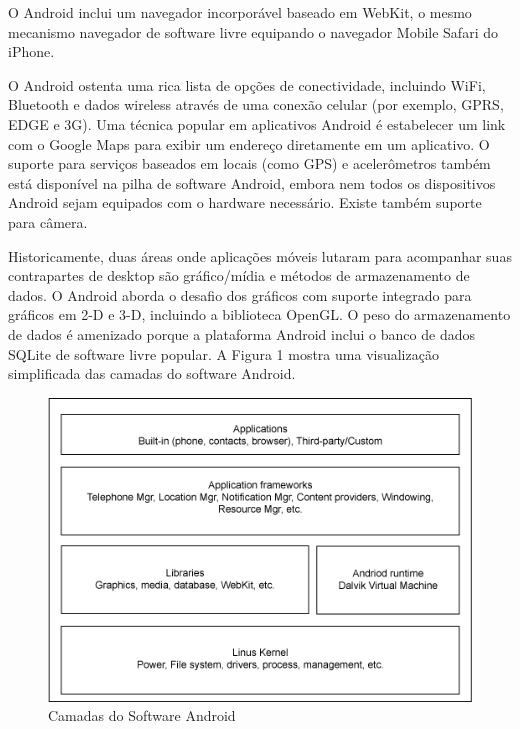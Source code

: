 \documentclass[12pt, %
openright, 
oneside, %
a4paper,    %
brazil]{facom-ufu-abntex2}
\begin{document}
O Android inclui um navegador incorporável baseado em WebKit, o mesmo mecanismo navegador de software livre equipando o navegador Mobile Safari do iPhone.

O Android ostenta uma rica lista de opções de conectividade, incluindo WiFi, Bluetooth e dados wireless através de uma conexão celular (por exemplo, GPRS, EDGE e 3G). Uma técnica popular em aplicativos Android é estabelecer um link com o Google Maps para exibir um endereço diretamente em um aplicativo. O suporte para serviços baseados em locais (como GPS) e acelerômetros também está disponível na pilha de software Android, embora nem todos os dispositivos Android sejam equipados com o hardware necessário. Existe também suporte para câmera.

Historicamente, duas áreas onde aplicações móveis lutaram para acompanhar suas contrapartes de desktop são gráfico/mídia e métodos de armazenamento de dados. O Android aborda o desafio dos gráficos com suporte integrado para gráficos em 2-D e 3-D, incluindo a biblioteca OpenGL. O peso do armazenamento de dados é amenizado porque a plataforma Android inclui o banco de dados SQLite de software livre popular. A Figura 1 mostra uma visualização simplificada das camadas do software Android.

\begin{figure}[!htb]
    \centering
    \includegraphics[scale=0.8,natwidth=610,natheight=64]{plataformas.png}
    \caption{Camadas do Software Android}
    \label{figRotulo}
  \end{figure}
\end{document}
